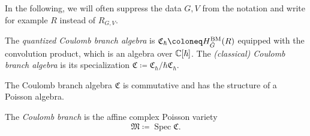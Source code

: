 \begin{remark}
	In the following, we will often suppress the data $G,V$ from the notation and write for example $R$ instead of $R_{G,V}$.
\end{remark}

\begin{definition}
	The \emph{quantized Coulomb branch algebra} is $\mathfrak{C}_\hbar \coloneq H_{\tilde G}^\textup{BM}(R)$ equipped with the convolution product, which is an algebra over $\mathbb{C}[\hbar]$. The \emph{(classical) Coulomb branch algebra} is its specialization $\mathfrak{C} \coloneq \mathfrak{C}_\hbar/\hbar \mathfrak{C}_\hbar$.
\end{definition}

\begin{prop}
	The Coulomb branch algebra $\mathfrak{C}$ is commutative and has the structure of a Poisson algebra.
\end{prop}

\begin{definition}
	The \emph{Coulomb branch} is the affine complex Poisson variety
	\begin{equation}
		\mathfrak{M} \coloneq \operatorname{Spec} \mathfrak{C}.
	\end{equation}
\end{definition}

